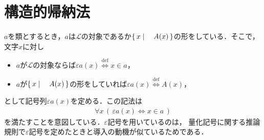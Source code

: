 \section{構造的帰納法}
	
	$a$を類とするとき，$a$は$\mathcal{L}$の対象であるか$\left\{\, x \mid \quad A(x)\, \right\}$の形をしている．そこで，文字$x$に対し
	\begin{itemize}
		\item $a$が$\mathcal{L}$の対象ならば$\varepsilon a(x) \overset{\mathrm{def}}{\Longleftrightarrow} x \in a$，
		\item $a$が$\left\{\, x \mid \quad A(x)\, \right\}$の形をしていれば$\varepsilon a(x) \overset{\mathrm{def}}{\Longleftrightarrow} A(x)$，
	\end{itemize}
	として記号列$\varepsilon a(x)$を定める．この記法は
	\begin{align}
		\forall x\, (\, \varepsilon a(x) \Longleftrightarrow x \in a\, )
		\label{eq:a_meaning_of_epsilon_notation}
	\end{align}
	を満たすことを意図している．$\varepsilon$記号を用いているのは，
	量化記号に関する推論規則で$\varepsilon$記号を定めたときと導入の動機が似ているためである．
	
